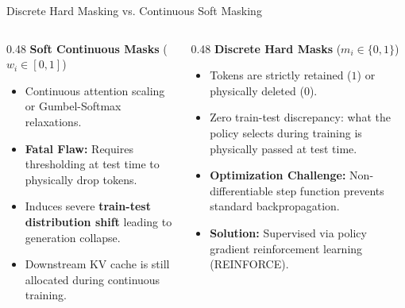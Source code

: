 \documentclass[aspectratio=169,10pt]{beamer}
\begin{document}
\begin{frame}{Discrete Hard Masking vs. Continuous Soft Masking}
  \begin{columns}[T]
    \begin{column}{0.48\textwidth}
      \textbf{Soft Continuous Masks} ($w_i \in [0, 1]$)
      \begin{itemize}
        \item Continuous attention scaling or Gumbel-Softmax relaxations.
        \item \textbf{Fatal Flaw:} Requires thresholding at test time to physically drop tokens.
        \item Induces severe \textbf{train-test distribution shift} leading to generation collapse.
        \item Downstream KV cache is still allocated during continuous training.
      \end{itemize}
    \end{column}
    \begin{column}{0.48\textwidth}
      \textbf{Discrete Hard Masks} ($m_i \in \{0, 1\}$)
      \begin{itemize}
        \item Tokens are strictly retained ($1$) or physically deleted ($0$).
        \item Zero train-test discrepancy: what the policy selects during training is physically passed at test time.
        \item \textbf{Optimization Challenge:} Non-differentiable step function prevents standard backpropagation.
        \item \textbf{Solution:} Supervised via policy gradient reinforcement learning (REINFORCE).
      \end{itemize}
    \end{column}
  \end{columns}
\end{frame}
\end{document}

